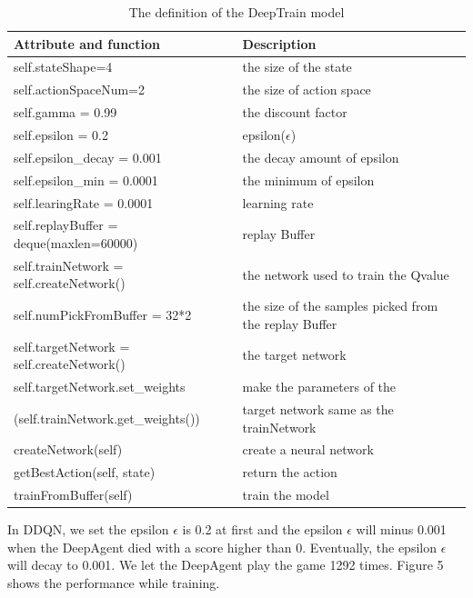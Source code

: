 \documentclass[conference,compsoc]{IEEEtran}
\begin{document}
\begin{table}[!t]
\renewcommand{\arraystretch}{1.3}
\caption{The definition of the DeepTrain model}
\label{table_5}
\centering
\begin{tabular}{|p{110pt}|p{110pt}|}
\hline
Attribute and function & Description\\
\hline
self.stateShape=4 & the size of the state\\
\hline
self.actionSpaceNum=2 & the size of action space\\
\hline
self.gamma = 0.99 & the discount factor\\
\hline
self.epsilon = 0.2 & epsilon(${\epsilon}$)\\
\hline
self.epsilon\_decay = 0.001 & the decay amount of epsilon\\
\hline
self.epsilon\_min = 0.0001 & the minimum of epsilon\\
\hline
self.learingRate = 0.0001 & learning rate\\
\hline
self.replayBuffer = deque(maxlen=60000) & replay Buffer\\
\hline

self.trainNetwork = self.createNetwork() & the network used to train the Qvalue\\
\hline

self.numPickFromBuffer = 32*2 & the size of the samples picked from the replay Buffer\\
\hline

self.targetNetwork = self.createNetwork() & the target network\\
\hline

self.targetNetwork.set\_weights& make the parameters of the\\
(self.trainNetwork.get\_weights()) & target network same as the trainNetwork\\
\hline

createNetwork(self) & create a neural network\\
\hline

getBestAction(self, state) & return the action\\
\hline
trainFromBuffer(self) & train the model\\
\hline
\end{tabular}
\end{table}

In DDQN, we set the epsilon ${\epsilon}$ is 0.2 at first and the epsilon ${\epsilon}$ will minus 0.001 when the DeepAgent died with a score higher than 0. Eventually, the epsilon ${\epsilon}$ will decay to 0.001. We let the DeepAgent play the game 1292 times. Figure 5 shows the performance while training.
\end{document}
